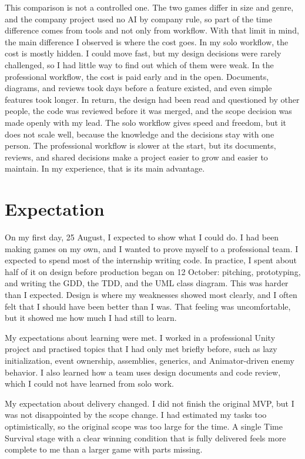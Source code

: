 \pagebreak
This comparison is not a controlled one. The two games differ in size and genre, and the company project used no AI by company rule, so part of the time difference comes from tools and not only from workflow. With that limit in mind, the main difference I observed is where the cost goes. In my solo workflow, the cost is mostly hidden. I could move fast, but my design decisions were rarely challenged, so I had little way to find out which of them were weak. In the professional workflow, the cost is paid early and in the open. Documents, diagrams, and reviews took days before a feature existed, and even simple features took longer. In return, the design had been read and questioned by other people, the code was reviewed before it was merged, and the scope decision was made openly with my lead. The solo workflow gives speed and freedom, but it does not scale well, because the knowledge and the decisions stay with one person. The professional workflow is slower at the start, but its documents, reviews, and shared decisions make a project easier to grow and easier to maintain. In my experience, that is its main advantage.

\section{Expectation}
On my first day, 25 August, I expected to show what I could do. I had been making games on my own, and I wanted to prove myself to a professional team. I expected to spend most of the internship writing code. In practice, I spent about half of it on design before production began on 12 October: pitching, prototyping, and writing the GDD, the TDD, and the UML class diagram. This was harder than I expected. Design is where my weaknesses showed most clearly, and I often felt that I should have been better than I was. That feeling was uncomfortable, but it showed me how much I had still to learn.

My expectations about learning were met. I worked in a professional Unity project and practised topics that I had only met briefly before, such as lazy initialization, event ownership, assemblies, generics, and Animator-driven enemy behavior. I also learned how a team uses design documents and code review, which I could not have learned from solo work.

My expectation about delivery changed. I did not finish the original MVP, but I was not disappointed by the scope change. I had estimated my tasks too optimistically, so the original scope was too large for the time. A single Time Survival stage with a clear winning condition that is fully delivered feels more complete to me than a larger game with parts missing.

